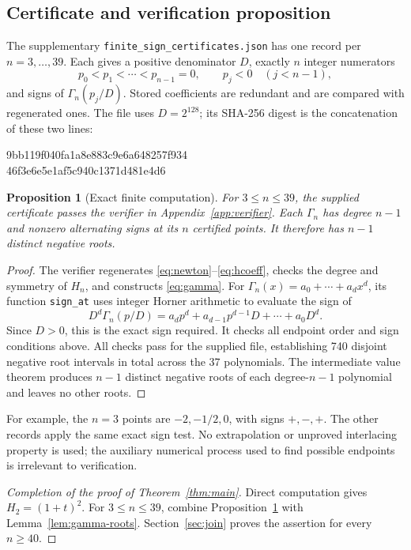 \documentclass[11pt,letterpaper]{article}
\numberwithin{equation}{section}
\newtheorem{proposition}[theorem]{Proposition}
\begin{document}
\subsection{Certificate and verification proposition}
The supplementary \texttt{finite\_sign\_certificates.json} has one record per $n=3,\ldots,39$. Each gives a positive denominator $D$, exactly $n$ integer numerators
\[
 p_0<p_1<\cdots<p_{n-1}=0,\qquad p_j<0\quad(j<n-1),
\]
and signs of $\Gamma_n(p_j/D)$. Stored coefficients are redundant and are compared with regenerated ones. The file uses $D=2^{128}$; its SHA-256 digest is the concatenation of these two lines:
\begin{center}\ttfamily\small
 9bb119f040fa1a8e883c9e6a648257f934\\
 46f3e6e5e1af5c940c1371d481e4d6
\end{center}
\begin{proposition}[Exact finite computation]\label{prop:finite}
For $3\le n\le39$, the supplied certificate passes the verifier in Appendix~\ref{app:verifier}. Each $\Gamma_n$ has degree $n-1$ and nonzero alternating signs at its $n$ certified points. It therefore has $n-1$ distinct negative roots.
\end{proposition}
\begin{proof}
The verifier regenerates \eqref{eq:newton}--\eqref{eq:hcoeff}, checks the degree and symmetry of $H_n$, and constructs \eqref{eq:gamma}. For $\Gamma_n(x)=a_0+\cdots+a_dx^d$, its function \texttt{sign\_at} uses integer Horner arithmetic to evaluate the sign of
\[
 D^d\Gamma_n(p/D)=a_dp^d+a_{d-1}p^{d-1}D+\cdots+a_0D^d.
\]
Since $D>0$, this is the exact sign required. It checks all endpoint order and sign conditions above. All checks pass for the supplied file, establishing 740 disjoint negative root intervals in total across the 37 polynomials. The intermediate value theorem produces $n-1$ distinct negative roots of each degree-$n-1$ polynomial and leaves no other roots.
\end{proof}
For example, the $n=3$ points are $-2,-1/2,0$, with signs $+,-,+$. The other records apply the same exact sign test. No extrapolation or unproved interlacing property is used; the auxiliary numerical process used to find possible endpoints is irrelevant to verification.
\begin{proof}[Completion of the proof of Theorem~\ref{thm:main}]
Direct computation gives $H_2=(1+t)^2$. For $3\le n\le39$, combine Proposition~\ref{prop:finite} with Lemma~\ref{lem:gamma-roots}. Section~\ref{sec:join} proves the assertion for every $n\ge40$.
\end{proof}
\end{document}
